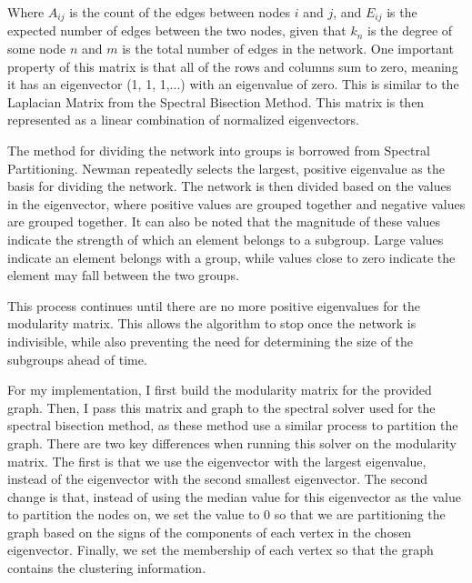 \documentclass{article}
\begin{document}
    Where $A_{ij}$ is the count of the edges between nodes $i$ and $j$, and $E_{ij}$ is the expected number of edges between the two nodes, given that $k_n$ is the degree of some node $n$ and $m$ is the total number of edges in the network. One important property of this matrix is that all of the rows and columns sum to zero, meaning it has an eigenvector (1, 1, 1,...) with an eigenvalue of zero. This is similar to the Laplacian Matrix from the Spectral Bisection Method. This matrix is then represented as a linear combination of normalized eigenvectors.
    \par
    The method for dividing the network into groups is borrowed from Spectral Partitioning. Newman repeatedly selects the largest, positive eigenvalue as the basis for dividing the network. The network is then divided based on the values in the eigenvector, where positive values are grouped together and negative values are grouped together. It can also be noted that the magnitude of these values indicate the strength of which an element belongs to a subgroup. Large values indicate an element belongs with a group, while values close to zero indicate the element may fall between the two groups.
    \par
    This process continues until there are no more positive eigenvalues for the modularity matrix. This allows the algorithm to stop once the network is indivisible, while also preventing the need for determining the size of the subgroups ahead of time.
    \par
    For my implementation, I first build the modularity matrix for the provided graph. Then, I pass this matrix and graph to the spectral solver used for the spectral bisection method, as these method use a similar process to partition the graph. There are two key differences when running this solver on the modularity matrix. The first is that we use the eigenvector with the largest eigenvalue, instead of the eigenvector with the second smallest eigenvector. The second change is that, instead of using the median value for this eigenvector as the value to partition the nodes on, we set the value to 0 so that we are partitioning the graph based on the signs of the components of each vertex in the chosen eigenvector. Finally, we set the membership of each vertex so that the graph contains the clustering information.
\end{document}
